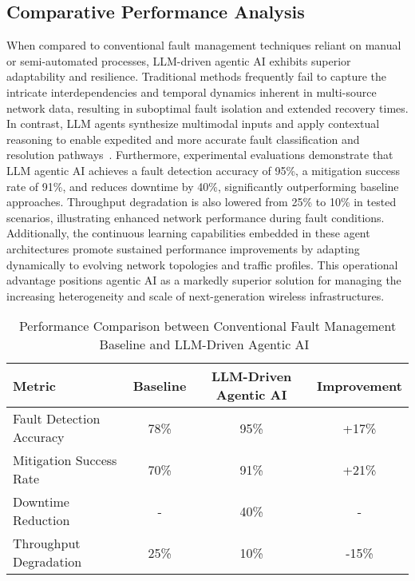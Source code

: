 \documentclass[sigconf]{acmart}
\begin{document}
\subsection{Comparative Performance Analysis}

When compared to conventional fault management techniques reliant on manual or semi-automated processes, LLM-driven agentic AI exhibits superior adaptability and resilience. Traditional methods frequently fail to capture the intricate interdependencies and temporal dynamics inherent in multi-source network data, resulting in suboptimal fault isolation and extended recovery times. In contrast, LLM agents synthesize multimodal inputs and apply contextual reasoning to enable expedited and more accurate fault classification and resolution pathways~\cite{ref55}. Furthermore, experimental evaluations demonstrate that LLM agentic AI achieves a fault detection accuracy of 95\%, a mitigation success rate of 91\%, and reduces downtime by 40\%, significantly outperforming baseline approaches. Throughput degradation is also lowered from 25\% to 10\% in tested scenarios, illustrating enhanced network performance during fault conditions. Additionally, the continuous learning capabilities embedded in these agent architectures promote sustained performance improvements by adapting dynamically to evolving network topologies and traffic profiles. This operational advantage positions agentic AI as a markedly superior solution for managing the increasing heterogeneity and scale of next-generation wireless infrastructures.

\begin{table*}[htbp]
\centering
\caption{Performance Comparison between Conventional Fault Management Baseline and LLM-Driven Agentic AI~\cite{ref55}}
\label{tab:performance_comparison}
\begin{adjustbox}{max width=\textwidth}
\begin{tabular}{@{}lccc@{}}
\toprule
Metric & Baseline & LLM-Driven Agentic AI & Improvement \\ \midrule
Fault Detection Accuracy & 78\% & 95\% & +17\% \\
Mitigation Success Rate & 70\% & 91\% & +21\% \\
Downtime Reduction & - & 40\% & - \\
Throughput Degradation & 25\% & 10\% & -15\% \\ \bottomrule
\end{tabular}
\end{adjustbox}
\end{table*}
\end{document}
